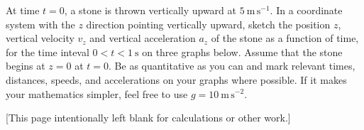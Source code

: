 \documentclass[12pt]{article}
\begin{document}
At time $t=0$, a stone is thrown vertically upward at
$5~\mathrm{m\,s^{-1}}$.  In a coordinate system with the $z$ direction
pointing vertically upward, sketch the position $z$, vertical velocity
$v_z$ and vertical acceleration $a_z$ of the stone as a function of
time, for the time inteval $0<t<1~\mathrm{s}$ on three graphs below.
Assume that the stone begins at $z=0$ at $t=0$.  Be as quantitative as
you can and mark relevant times, distances, speeds, and accelerations
on your graphs where possible.  If it makes your mathematics simpler,
feel free to use $g= 10~\mathrm{m\,s^{-2}}$.

\clearpage

[This page intentionally left blank for calculations or other work.]
\end{document}
